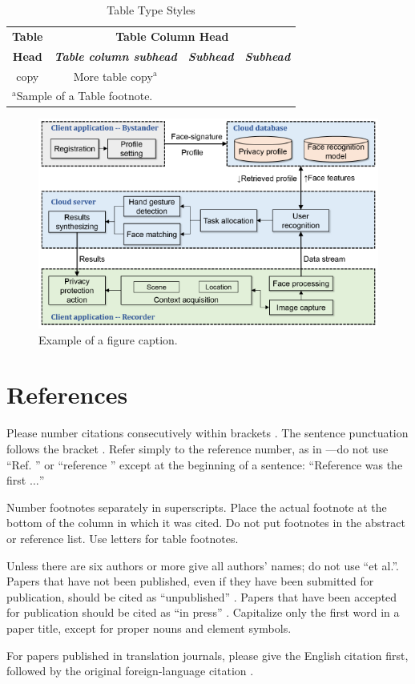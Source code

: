 \documentclass[conference]{IEEEtran}
\begin{document}
\begin{table}[htbp]
\caption{Table Type Styles}
\begin{center}
\begin{tabular}{|c|c|c|c|}
\hline
\textbf{Table}&\multicolumn{3}{|c|}{\textbf{Table Column Head}} \\
\cline{2-4} 
\textbf{Head} & \textbf{\textit{Table column subhead}}& \textbf{\textit{Subhead}}& \textbf{\textit{Subhead}} \\
\hline
copy& More table copy$^{\mathrm{a}}$& &  \\
\hline
\multicolumn{4}{l}{$^{\mathrm{a}}$Sample of a Table footnote.}
\end{tabular}
\label{tab1}
\end{center}
\end{table}

\begin{figure}[t]
\centerline{\includegraphics[width=.5\textwidth]{img/cardea_overview_diagram.png}}
\caption{Example of a figure caption.}
\label{fig}
\end{figure}


\section*{References}

Please number citations consecutively within brackets \cite{shu2016cardea}. The 
sentence punctuation follows the bracket \cite{dufaux2010framework}. Refer simply to the reference 
number, as in \cite{denning2014situ}---do not use ``Ref. \cite{denning2014situ}'' or ``reference \cite{denning2014situ}'' except at 
the beginning of a sentence: ``Reference \cite{lu2017privacy} was the first $\ldots$''

Number footnotes separately in superscripts. Place the actual footnote at 
the bottom of the column in which it was cited. Do not put footnotes in the 
abstract or reference list. Use letters for table footnotes.

Unless there are six authors or more give all authors' names; do not use 
``et al.''. Papers that have not been published, even if they have been 
submitted for publication, should be cited as ``unpublished'' \cite{lu2017privacy}. Papers 
that have been accepted for publication should be cited as ``in press'' \cite{olteanu2018consensual}. 
Capitalize only the first word in a paper title, except for proper nouns and 
element symbols.

For papers published in translation journals, please give the English 
citation first, followed by the original foreign-language citation \cite{olteanu2018consensual}.


{\footnotesize
}
\end{document}
